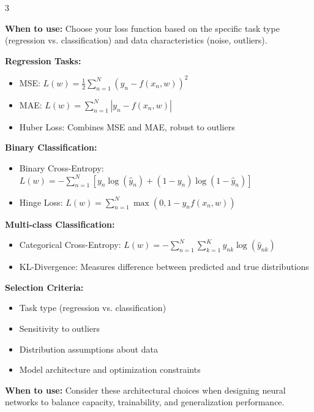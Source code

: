 \documentclass[10pt,landscape]{article}
\begin{document}
\begin{multicols}{3}
\begin{tcolorbox}[breakable, title=3.1 Neural Network Loss Functions, colback=neural]
\textbf{When to use:} Choose your loss function based on the specific task type (regression vs. classification) and data characteristics (noise, outliers).

\textbf{Regression Tasks:}
\begin{itemize}[leftmargin=*,noitemsep,topsep=0pt]
    \item MSE: $L(w) = \frac{1}{2}\sum_{n=1}^{N}(y_n - f(x_n, w))^2$
    \item MAE: $L(w) = \sum_{n=1}^{N}|y_n - f(x_n, w)|$
    \item Huber Loss: Combines MSE and MAE, robust to outliers
\end{itemize}

\textbf{Binary Classification:}
\begin{itemize}[leftmargin=*,noitemsep,topsep=0pt]
    \item Binary Cross-Entropy: 
    $L(w) = -\sum_{n=1}^{N}[y_n\log(\hat{y}_n) + (1-y_n)\log(1-\hat{y}_n)]$
    \item Hinge Loss: $L(w) = \sum_{n=1}^{N}\max(0, 1-y_n f(x_n, w))$
\end{itemize}

\textbf{Multi-class Classification:}
\begin{itemize}[leftmargin=*,noitemsep,topsep=0pt]
    \item Categorical Cross-Entropy: 
    $L(w) = -\sum_{n=1}^{N}\sum_{k=1}^{K}y_{nk}\log(\hat{y}_{nk})$
    \item KL-Divergence: Measures difference between predicted and true distributions
\end{itemize}

\textbf{Selection Criteria:}
\begin{itemize}[leftmargin=*,noitemsep,topsep=0pt]
    \item Task type (regression vs. classification)
    \item Sensitivity to outliers
    \item Distribution assumptions about data
    \item Model architecture and optimization constraints
\end{itemize}
\end{tcolorbox}

\begin{tcolorbox}[breakable, title=3.2 Neural Network Architecture Analysis, colback=neural]
\textbf{When to use:} Consider these architectural choices when designing neural networks to balance capacity, trainability, and generalization performance.


\end{tcolorbox}
\end{multicols}
\end{document}
